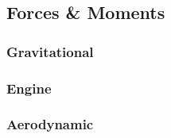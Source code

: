 \subsection{Forces \& Moments}

\subsubsection{Gravitational}

\subsubsection{Engine}

\subsubsection{Aerodynamic}
